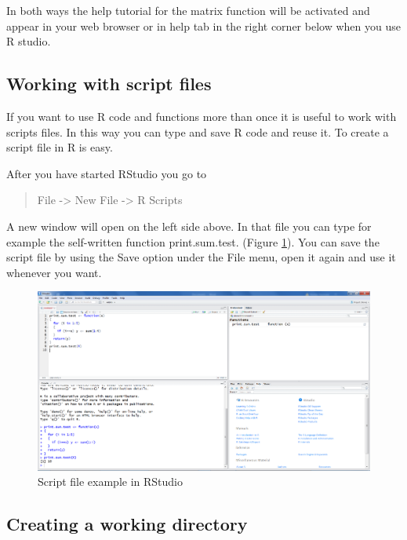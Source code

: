 \documentclass[]{book}
\begin{document}
In both ways the help tutorial for the matrix function will be activated
and appear in your web browser or in help tab in the right corner below
when you use R studio.

\subsection{Working with script files}\label{working-with-script-files}

If you want to use R code and functions more than once it is useful to
work with scripts files. In this way you can type and save R code and
reuse it. To create a script file in R is easy.

After you have started RStudio you go to

\begin{quote}
File -\textgreater{} New File -\textgreater{} R Scripts
\end{quote}

A new window will open on the left side above. In that file you can type
for example the self-written function print.sum.test. (Figure
\ref{fig:fig11}). You can save the script file by using the Save option
under the File menu, open it again and use it whenever you want.

\begin{figure}

{\centering \includegraphics[width=0.95\linewidth]{images/fig1.11} 

}

\caption{Script file example in RStudio}\label{fig:fig11}
\end{figure}

\subsection{Creating a working
directory}\label{creating-a-working-directory}
\end{document}
